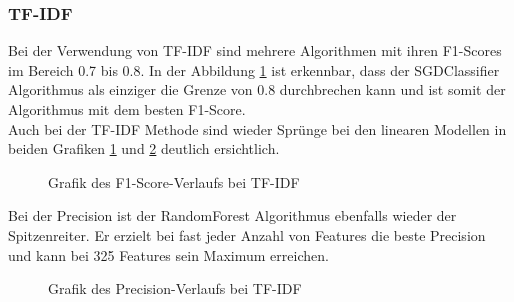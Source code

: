 \subsubsection{TF-IDF}
Bei der Verwendung von TF-IDF sind mehrere Algorithmen mit ihren F1-Scores im Bereich 0.7 bis 0.8.
In der Abbildung \cref{abb:tfidf-f1} ist erkennbar, dass der SGDClassifier Algorithmus als einziger die Grenze von 0.8 durchbrechen kann und ist somit der Algorithmus mit dem besten F1-Score.\\
Auch bei der TF-IDF Methode sind wieder Sprünge bei den linearen Modellen in beiden Grafiken \cref{abb:tfidf-f1} und \cref{abb:tfidf-pre} deutlich ersichtlich.
\begin{figure}[H]	
	\setlength{\fboxsep}{0.3pt} 
	\setlength{\fboxrule}{0.3pt} 
	\caption{Grafik des F1-Score-Verlaufs bei TF-IDF}
	\label{abb:tfidf-f1}
\end{figure}
Bei der Precision ist der RandomForest Algorithmus ebenfalls wieder der Spitzenreiter.
Er erzielt bei fast jeder Anzahl von Features die beste Precision und kann bei 325 Features sein Maximum erreichen.
\begin{figure}[H]	
	\setlength{\fboxsep}{0.3pt} 
	\setlength{\fboxrule}{0.3pt} 
	\caption{Grafik des Precision-Verlaufs bei TF-IDF}
	\label{abb:tfidf-pre}
\end{figure}
